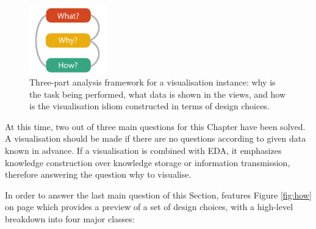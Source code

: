 \begin{figure}[!htb]
\centering
\includegraphics[width=0.3\textwidth,keepaspectratio]{images/basics/analysis-framework.png}
\caption[
    Three-part analysis framework for a visualisation instance: why is the task being performed, what data is shown in the views, and how is the visualisation idiom constructed in terms of design choices .
]{Three-part analysis framework for a visualisation instance: why is the task being performed, what data is shown in the views, and how is the visualisation idiom constructed in terms of design choices.}
\label{fig:an-framework}
\end{figure}

At this time, two out of three main questions for this Chapter have been solved. A visualisation should be made if there are no questions according to given data known in advance. If a visualisation is combined with \ac{EDA}, it emphasizes knowledge construction over knowledge storage or information transmission, therefore answering the question why to visualise.

In order to answer the last main question of this Section, \citeauthor{Munzner2014} features Figure \ref{fig:how} on page \pageref{fig:how} which provides a preview of a set of design choices, with a high-level breakdown into four major classes:

